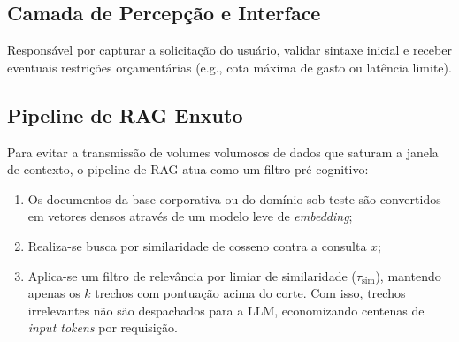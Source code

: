 \subsection{Camada de Percepção e Interface}
Responsável por capturar a solicitação do usuário, validar sintaxe inicial e receber eventuais restrições orçamentárias (e.g., cota máxima de gasto ou latência limite).

\subsection{Pipeline de RAG Enxuto}
Para evitar a transmissão de volumes volumosos de dados que saturam a janela de contexto, o pipeline de RAG atua como um filtro pré-cognitivo:
\begin{enumerate}
    \item Os documentos da base corporativa ou do domínio sob teste são convertidos em vetores densos através de um modelo leve de \textit{embedding};
    \item Realiza-se busca por similaridade de cosseno contra a consulta $x$;
    \item Aplica-se um filtro de relevância por limiar de similaridade ($\tau_{\text{sim}}$), mantendo apenas os $k$ trechos com pontuação acima do corte. Com isso, trechos irrelevantes não são despachados para a LLM, economizando centenas de \textit{input tokens} por requisição.
\end{enumerate}

